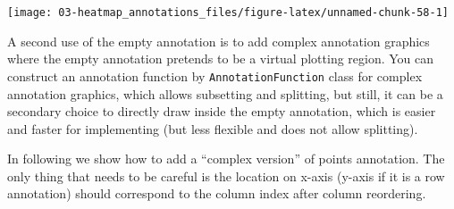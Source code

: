 \documentclass[]{book}
\theoremstyle{definition}
\theoremstyle{definition}
\theoremstyle{definition}
\theoremstyle{remark}
\begin{document}
\begin{center}\texttt{[image: 03-heatmap\_annotations\_files/figure-latex/unnamed-chunk-58-1]} \end{center}

A second use of the empty annotation is to add complex annotation
graphics where the empty annotation pretends to be a virtual plotting
region. You can construct an annotation function by
\texttt{AnnotationFunction} class for complex annotation graphics, which
allows subsetting and splitting, but still, it can be a secondary choice
to directly draw inside the empty annotation, which is easier and faster
for implementing (but less flexible and does not allow splitting).

In following we show how to add a ``complex version'' of points
annotation. The only thing that needs to be careful is the location on
x-axis (y-axis if it is a row annotation) should correspond to the
column index after column reordering.
\end{document}
